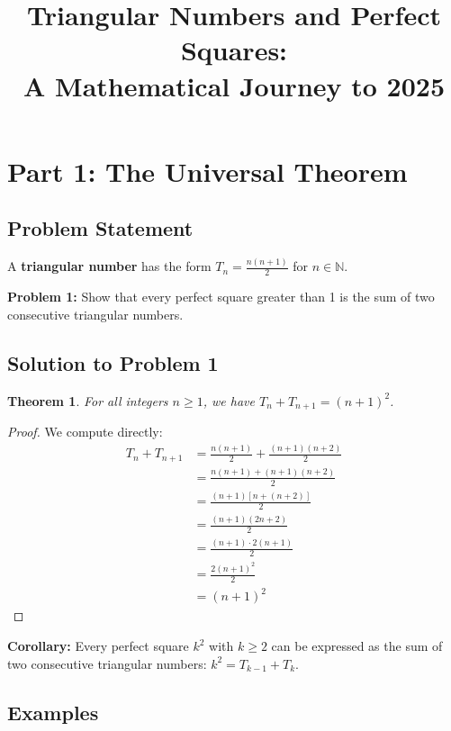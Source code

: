 \documentclass[12pt]{article}
\title{Triangular Numbers and Perfect Squares:\\A Mathematical Journey to 2025}
\author{}
\date{}
\newtheorem{theorem}{Theorem}
\begin{document}
\maketitle

\section*{Part 1: The Universal Theorem}

\subsection*{Problem Statement}

A \textbf{triangular number} has the form $T_n = \frac{n(n+1)}{2}$ for $n \in \mathbb{N}$.

\vspace{0.3cm}

\textbf{Problem 1:} Show that every perfect square greater than 1 is the sum of two consecutive triangular numbers.

\subsection*{Solution to Problem 1}

\begin{theorem}
For all integers $n \geq 1$, we have $T_n + T_{n+1} = (n+1)^2$.
\end{theorem}

\begin{proof}
We compute directly:
\begin{align*}
T_n + T_{n+1} &= \frac{n(n+1)}{2} + \frac{(n+1)(n+2)}{2} \\
&= \frac{n(n+1) + (n+1)(n+2)}{2} \\
&= \frac{(n+1)[n + (n+2)]}{2} \\
&= \frac{(n+1)(2n+2)}{2} \\
&= \frac{(n+1) \cdot 2(n+1)}{2} \\
&= \frac{2(n+1)^2}{2} \\
&= (n+1)^2
\end{align*}
\end{proof}

\textbf{Corollary:} Every perfect square $k^2$ with $k \geq 2$ can be expressed as the sum of two consecutive triangular numbers: $k^2 = T_{k-1} + T_k$.

\subsection*{Examples}
\end{document}
